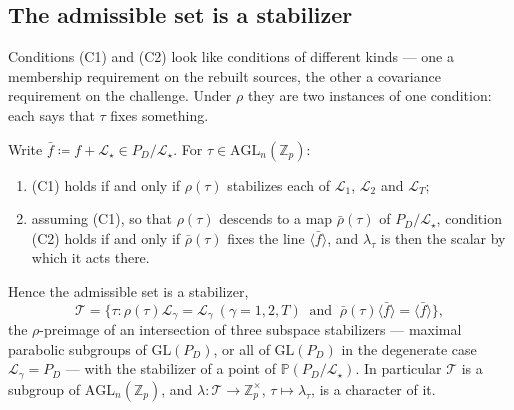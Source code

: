 \documentclass{conjura-solution}
\newcommand{\Zp}{\mathbb{Z}_p}
\newcommand{\Zpx}{\mathbb{Z}_p^{\times}}
\newcommand{\LL}{\mathcal{L}}
\newcommand{\Span}[1]{\langle #1 \rangle} %
\newcommand{\GL}{\mathrm{GL}}
\newcommand{\AGL}{\mathrm{AGL}}
\newcommand{\PP}{\mathbb{P}}
\begin{document}
\subsection{The admissible set is a stabilizer}

Conditions \textup{(C1)} and \textup{(C2)} look like conditions of different kinds --- one a
membership requirement on the rebuilt sources, the other a covariance requirement on the
challenge. Under $\rho$ they are two instances of one condition: each says that $\tau$ fixes
something.

\begin{lemma}
\label{lem:stab}
Write $\bar f\coloneqq f+\LL_\star\in P_D/\LL_\star$. For $\tau\in\AGL_n(\Zp)$:
\begin{enumerate}[label=\textup{(\roman*)},leftmargin=2.6em,itemsep=2pt]
  \item \textup{(C1)} holds if and only if $\rho(\tau)$ stabilizes each of $\LL_1$, $\LL_2$ and
        $\LL_T$;
  \item assuming \textup{(C1)}, so that $\rho(\tau)$ descends to a map $\bar\rho(\tau)$ of
        $P_D/\LL_\star$, condition \textup{(C2)} holds if and only if $\bar\rho(\tau)$ fixes the
        line $\Span{\bar f}$, and $\lambda_\tau$ is then the scalar by which it acts there.
\end{enumerate}
Hence the admissible set is a stabilizer,
\[
  \mathcal T=\bigl\{\tau:\rho(\tau)\LL_\gamma=\LL_\gamma\ (\gamma=1,2,T)
  \ \text{ and }\ \bar\rho(\tau)\Span{\bar f}=\Span{\bar f}\bigr\},
\]
the $\rho$-preimage of an intersection of three subspace stabilizers --- maximal parabolic
subgroups of $\GL(P_D)$, or all of $\GL(P_D)$ in the degenerate case $\LL_\gamma=P_D$ ---
with the stabilizer of a point of $\PP(P_D/\LL_\star)$. In particular $\mathcal T$ is a subgroup
of $\AGL_n(\Zp)$, and $\lambda\colon\mathcal T\to\Zpx$, $\tau\mapsto\lambda_\tau$, is a
character of it.
\end{lemma}
\end{document}

